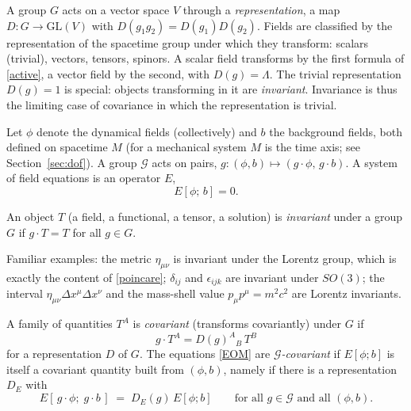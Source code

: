 A group $G$ acts on a vector space $V$ through a \emph{representation},
a map $D\colon G\to \mathrm{GL}(V)$ with $D(g_1g_2)=D(g_1)D(g_2)$.
Fields are classified by the representation of the spacetime group under
which they transform: scalars (trivial), vectors, tensors, spinors. A scalar
field transforms by the first formula of \eqref{active}, a vector field by
the second, with $D(g)=\Lambda$. The trivial representation $D(g)=1$ is
special: objects transforming in it are \emph{invariant}. Invariance is thus
the limiting case of covariance in which the representation is trivial.

Let $\phi$ denote the dynamical fields (collectively) and $b$ the background
fields, both defined on spacetime $M$ (for a mechanical system $M$ is the time axis;
see Section~\ref{sec:dof}). A group $\mathcal G$ acts on pairs,
$g\colon(\phi,b)\mapsto(g\cdot\phi,\,g\cdot b)$. A system of field equations
is an operator $E$,
\begin{equation}\label{EOM}
  E[\phi;\,b]=0 .
\end{equation}

\begin{definition}[Invariance]\label{def:invariance}
An object $T$ (a field, a functional, a tensor, a solution) is
\emph{invariant} under a group $G$ if $g\cdot T=T$ for all $g\in G$.
\end{definition}

Familiar examples: the metric $\eta_{\mu\nu}$ is invariant under the
Lorentz group, which is exactly the content of \eqref{poincare}; $\delta_{ij}$
and $\epsilon_{ijk}$ are invariant under $SO(3)$; the interval
$\eta_{\mu\nu}\Delta x^\mu\Delta x^\nu$ and the mass-shell value
$p_\mu p^\mu=m^2c^2$ are Lorentz invariants.

\begin{definition}[Covariance]\label{def:covariance}
A family of quantities $T^A$ is \emph{covariant} (transforms covariantly)
under $G$ if
\begin{equation}\label{covariant-object}
  g\cdot T^A = D(g)^A{}_B\,T^B
\end{equation}
for a representation $D$ of $G$. The equations \eqref{EOM} are
\emph{$\mathcal G$-covariant} if $E[\phi;b]$ is itself a covariant quantity
built from $(\phi,b)$, namely if there is a representation $D_E$ with
\begin{equation}\label{covariant-eq}
  E[\,g\cdot\phi;\;g\cdot b\,] \;=\; D_E(g)\,E[\phi;b]
  \qquad\text{for all } g\in\mathcal G \text{ and all } (\phi,b).
\end{equation}
\end{definition}

